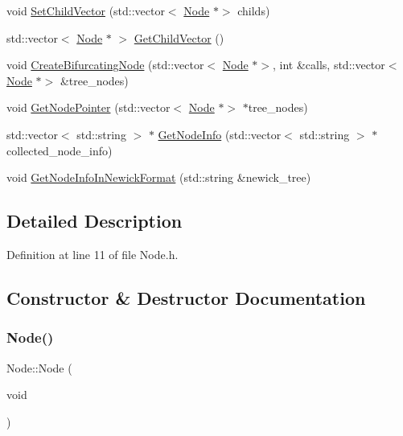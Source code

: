\begin{DoxyCompactItemize}
\item 
void \hyperlink{classNode_a7480924f7879b04fe8c787f42ee888fe}{Set\+Child\+Vector} (std\+::vector$<$ \hyperlink{classNode}{Node} $\ast$$>$ childs)
\item 
std\+::vector$<$ \hyperlink{classNode}{Node} $\ast$ $>$ \hyperlink{classNode_a9b9823315fd95dcd24aac97316de2859}{Get\+Child\+Vector} ()
\item 
void \hyperlink{classNode_aed21bd99e0d680ea7c6a1524e989b9d4}{Create\+Bifurcating\+Node} (std\+::vector$<$ \hyperlink{classNode}{Node} $\ast$$>$, int \&calls, std\+::vector$<$ \hyperlink{classNode}{Node} $\ast$$>$ \&tree\+\_\+nodes)
\item 
void \hyperlink{classNode_a8e58dc16fc38e2076c7ddbe5b9f04177}{Get\+Node\+Pointer} (std\+::vector$<$ \hyperlink{classNode}{Node} $\ast$$>$ $\ast$tree\+\_\+nodes)
\item 
std\+::vector$<$ std\+::string $>$ $\ast$ \hyperlink{classNode_aeb57ef43b22fa37c2855ebb07e4e7331}{Get\+Node\+Info} (std\+::vector$<$ std\+::string $>$ $\ast$collected\+\_\+node\+\_\+info)
\item 
void \hyperlink{classNode_aa7c6c2500e38ecf478b9141188f1c840}{Get\+Node\+Info\+In\+Newick\+Format} (std\+::string \&newick\+\_\+tree)
\end{DoxyCompactItemize}


\subsection{Detailed Description}


Definition at line 11 of file Node.\+h.



\subsection{Constructor \& Destructor Documentation}
\mbox{\label{classNode_ad7a34779cad45d997bfd6d3d8043c75f}} 
\subsubsection{\texorpdfstring{Node()}{Node()}}
{\footnotesize\ttfamily Node\+::\+Node (\begin{DoxyParamCaption}\item[{void}]{ }\end{DoxyParamCaption})}



